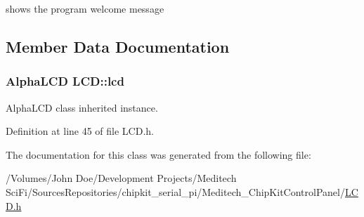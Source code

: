 shows the program welcome message 



\subsection{Member Data Documentation}
\hypertarget{class_l_c_d_ae4b9e9c4a04d3d976ffb09d112831a5a}{
\subsubsection[{lcd}]{\setlength{\rightskip}{0pt plus 5cm}Alpha\-L\-C\-D L\-C\-D\-::lcd\hspace{0.3cm}{\ttfamily [private]}}}\label{class_l_c_d_ae4b9e9c4a04d3d976ffb09d112831a5a}


Alpha\-L\-C\-D class inherited instance. 



Definition at line 45 of file L\-C\-D.\-h.



The documentation for this class was generated from the following file\-:\begin{DoxyCompactItemize}
\item 
/\-Volumes/\-John Doe/\-Development Projects/\-Meditech Sci\-Fi/\-Sources\-Repositories/chipkit\-\_\-serial\-\_\-pi/\-Meditech\-\_\-\-Chip\-Kit\-Control\-Panel/\hyperlink{_l_c_d_8h}{L\-C\-D.\-h}\end{DoxyCompactItemize}
